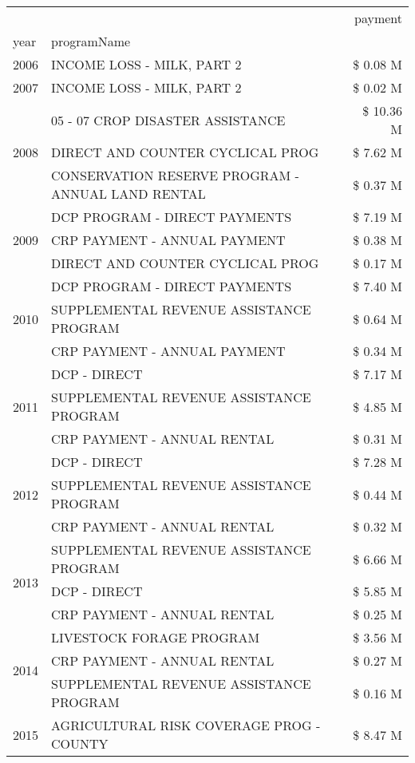 \begin{tabular}{llr}
\toprule
 &  & payment \\
year & programName &  \\
\midrule
2006 & INCOME LOSS - MILK, PART 2 & \$ 0.08 M \\
\cline{1-3}
2007 & INCOME LOSS - MILK, PART 2 & \$ 0.02 M \\
\cline{1-3}
\multirow[t]{3}{*}{2008} & 05 - 07 CROP DISASTER ASSISTANCE & \$ 10.36 M \\
 & DIRECT AND COUNTER CYCLICAL PROG & \$ 7.62 M \\
 & CONSERVATION RESERVE PROGRAM - ANNUAL LAND RENTAL & \$ 0.37 M \\
\cline{1-3}
\multirow[t]{3}{*}{2009} & DCP PROGRAM - DIRECT PAYMENTS & \$ 7.19 M \\
 & CRP PAYMENT - ANNUAL PAYMENT & \$ 0.38 M \\
 & DIRECT AND COUNTER CYCLICAL PROG & \$ 0.17 M \\
\cline{1-3}
\multirow[t]{3}{*}{2010} & DCP PROGRAM - DIRECT PAYMENTS & \$ 7.40 M \\
 & SUPPLEMENTAL REVENUE ASSISTANCE PROGRAM & \$ 0.64 M \\
 & CRP PAYMENT - ANNUAL PAYMENT & \$ 0.34 M \\
\cline{1-3}
\multirow[t]{3}{*}{2011} & DCP - DIRECT & \$ 7.17 M \\
 & SUPPLEMENTAL REVENUE ASSISTANCE PROGRAM & \$ 4.85 M \\
 & CRP PAYMENT - ANNUAL RENTAL & \$ 0.31 M \\
\cline{1-3}
\multirow[t]{3}{*}{2012} & DCP - DIRECT & \$ 7.28 M \\
 & SUPPLEMENTAL REVENUE ASSISTANCE PROGRAM & \$ 0.44 M \\
 & CRP PAYMENT - ANNUAL RENTAL & \$ 0.32 M \\
\cline{1-3}
\multirow[t]{3}{*}{2013} & SUPPLEMENTAL REVENUE ASSISTANCE PROGRAM & \$ 6.66 M \\
 & DCP - DIRECT & \$ 5.85 M \\
 & CRP PAYMENT - ANNUAL RENTAL & \$ 0.25 M \\
\cline{1-3}
\multirow[t]{3}{*}{2014} & LIVESTOCK FORAGE PROGRAM & \$ 3.56 M \\
 & CRP PAYMENT - ANNUAL RENTAL & \$ 0.27 M \\
 & SUPPLEMENTAL REVENUE ASSISTANCE PROGRAM & \$ 0.16 M \\
\cline{1-3}
\multirow[t]{3}{*}{2015} & AGRICULTURAL RISK COVERAGE PROG - COUNTY & \$ 8.47 M \\

\end{tabular}
